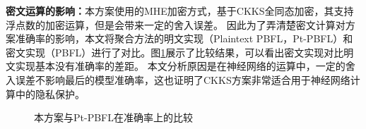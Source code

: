 \textbf{密文运算的影响：}本方案使用的MHE加密方式，基于CKKS全同态加密，其支持浮点数的加密运算，但是会带来一定的舍入误差。
因此为了弄清楚密文计算对方案准确率的影响，本文将聚合方法的明文实现（Plaintext PBFL，Pt-PBFL）和密文实现（PBFL）进行了对比。图\ref{f4}展示了比较结果，可以看出密文实现对比明文实现基本没有准确率的差距。
本文分析原因是在神经网络的运算中，一定的舍入误差不影响最后的模型准确率，这也证明了CKKS方案非常适合用于神经网络计算中的隐私保护。

\begin{figure}[htb]
	\centering
	\caption{本方案与Pt-PBFL在准确率上的比较}
	\label{f4}
\end{figure}

